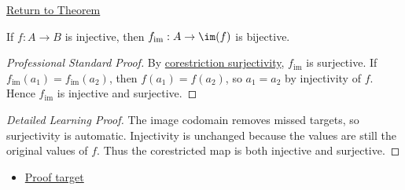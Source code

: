 \newpage
{}
\label{prf:injective-bijection-onto-image}

\begin{remark*}[Return]
\hyperref[thm:injective-bijection-onto-image]{Return to Theorem}
\end{remark*}

\begin{theorem*}
If $f:A\to B$ is injective, then $f_{\operatorname{im}}:A\to\im(f)$ is
bijective.
\end{theorem*}

\begin{proof}[Professional Standard Proof]
\LRAProofBodyStart
By \hyperref[prop:corestriction-surjective]{corestriction surjectivity},
$f_{\operatorname{im}}$ is surjective. If
$f_{\operatorname{im}}(a_1)=f_{\operatorname{im}}(a_2)$, then
$f(a_1)=f(a_2)$, so $a_1=a_2$ by injectivity of $f$. Hence
$f_{\operatorname{im}}$ is injective and surjective.
\end{proof}

\begin{proof}[Detailed Learning Proof]
\LRAProofBodyStart
The image codomain removes missed targets, so surjectivity is automatic.
Injectivity is unchanged because the values are still the original values of
$f$. Thus the corestricted map is both injective and surjective.
\end{proof}
\begin{remark*}
\end{remark*}



\begin{dependencies}
\begin{itemize}
  \item \hyperref[thm:injective-bijection-onto-image]{Proof target}
\end{itemize}
\end{dependencies}

\clearpage

